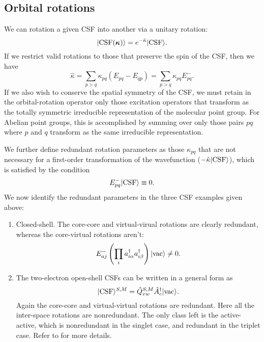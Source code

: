 \documentclass{article}
\begin{document}
\subsection{Orbital rotations}
We can rotation a given CSF into another via a unitary rotation:
\begin{equation}
|\mathrm{CSF}(\bm{\mathrm{\kappa}})\rangle=e^{-\hat{\kappa}}|\mathrm{CSF}\rangle.
\end{equation}
If we restrict valid rotations to those that preserve the spin of the CSF, then we have
\begin{equation}
    \hat{\kappa}=\sum_{p>q}\kappa_{pq}(E_{pq}-E_{qp})=\sum_{p>q}\kappa_{pq}E^-_{pq}.
\end{equation}
If we also wish to conserve the spatial symmetry of the CSF, we must retain in the orbital-rotation operator only those excitation operators that transform as the totally symmetric irreducible representation of the molecular point group. For Abelian point groups, this is accomplished by summing over only those pairs $pq$ where $p$ and $q$ transform as the same irreducible representation. 

We further define redundant rotation parameters as those $\kappa_{pq}$ that are not necessary for a first-order transformation of the wavefunction ($-\hat{\kappa}|\mathrm{CSF}\rangle$), which is satisfied by the condition
\begin{equation}
E_{pq}^-|\mathrm{CSF}\rangle\equiv 0.
\end{equation}
We now identify the redundant parameters in the three CSF examples given above:
\begin{enumerate}
    \item Closed-shell. The core-core and virtual-virual rotations are clearly redundant, whereas the core-virtual rotations aren't:
    \begin{equation}
    E_{aj}^-\left(\prod_ia_{i\alpha}^{\dagger}a_{i\beta}^{\dagger} \right)|\mathrm{vac}\rangle\neq 0.
    \end{equation}
    \item The two-electron open-shell CSFs can be written in a general form as
    \begin{equation}
    |\mathrm{CSF}\rangle^{S,M}=\hat{Q}_{vw}^{S,M}\hat{A}_c^{\dagger}|\mathrm{vac}\rangle.
    \end{equation}
    Again the core-core and virtual-virtual rotations are redundant. Here all the inter-space rotations are nonredundant. The only class left is the active-active, which is nonredundant in the singlet case, and redundant in the triplet case. Refer to \cite[Ch. 10.1.2]{helgakerMolecularElectronicStructure2000} for more details.
\end{enumerate}
\end{document}
